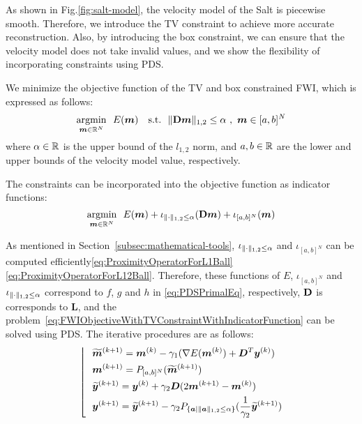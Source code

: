 As shown in Fig.\ref{fig:salt-model}, the velocity model of the Salt is piecewise smooth.
Therefore, we introduce the TV constraint to achieve more accurate reconstruction.
Also, by introducing the box constraint, we can ensure that the velocity model does not take invalid values, and we show the flexibility of incorporating constraints using PDS.

We minimize the objective function of the TV and box constrained FWI, which is expressed as follows:
\begin{equation} \label{eq:FWIObjectiveWithTVConstraint} \argmin{\velModel \in \realNumber^N} \ \ \FWIObjectiveWithTVConstraint \end{equation}
where $\alpha \in \mathbb{R}$ is the upper bound of the $l_{1,2}$ norm, and $a, b \in \mathbb{R}$ are the lower and upper bounds of the velocity model value, respectively.

The constraints can be incorporated into the objective function as indicator functions:
\begin{equation} \label{eq:FWIObjectiveWithTVConstraintWithIndicatorFunction} \argmin{\velModel \in \realNumber^N} \ \ \FWIObjectiveWithTVConstraintWithIndicatorFunction \end{equation}

As mentioned in Section~\ref{subsec:mathematical-tools}, $\iota_{\lVert \cdot \rVert _{1,2} \le \alpha}$ and $\iota_{[a,b]^N}$ can be computed efficiently\eqref{eq:ProximityOperatorForL1Ball}\eqref{eq:ProximityOperatorForL12Ball}.
Therefore, these functions of $E$, $\iota_{[a,b]^N}$ and $\iota_{\lVert \cdot \rVert _{1,2} \le \alpha}$ correspond to $f$, $g$ and $h$ in \eqref{eq:PDSPrimalEq}, respectively, $\mathbf{D}$ is corresponds to $\bm{L}$, and the problem~\eqref{eq:FWIObjectiveWithTVConstraintWithIndicatorFunction} can be solved using PDS.
The iterative procedures are as follows:
\begin{equation} \label{eq:FWIWithPDS} \left \lfloor \ \ \begin{aligned} & \widetilde{\bm{m}}^{(k+1)} = \bm{m}^{(k)} - \gamma_1( \nabla E(\bm{m}^{(k)}) + \bm{D}^T \bm{y}^{(k)} ) \\ & \bm{m}^{(k+1)} = P_{[a,b]^N}(\widetilde{\bm{m}}^{(k+1)}) \\ & \widetilde{\bm{y}}^{(k+1)} = \bm{y}^{(k)} + \gamma_2 \bm{D} (2\bm{m}^{(k+1)} - \bm{m}^{(k)}) \\ & \bm{y}^{(k+1)} = \widetilde{\bm{y}}^{(k+1)} - \gamma_2 P_{ \{ \bm a \mid \lVert  \bm a  \rVert _{1,2} \le \alpha \} }(\frac 1 {\gamma_2} {\widetilde{\bm y}^{(k+1)}}) \end{aligned} \right. \notag \end{equation}

